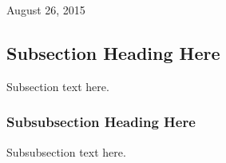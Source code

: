 \documentclass[conference]{IEEEtran}
\begin{document}
\hfill August 26, 2015

\subsection{Subsection Heading Here}
Subsection text here.


\subsubsection{Subsubsection Heading Here}
Subsubsection text here.


%
%



%
%
\end{document}

